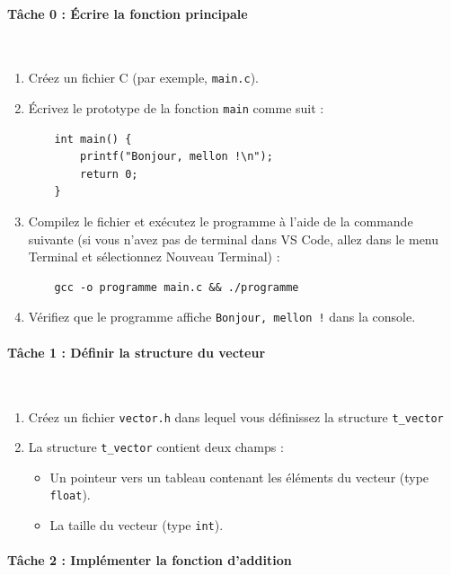 \begin{wtodo}{}

\paragraph{T\^ache 0 : \'Ecrire la fonction principale}\,

\begin{enumerate}
    \item Cr\'eez un fichier C (par exemple, \texttt{main.c}).
    \item \'Ecrivez le prototype de la fonction \texttt{main} comme suit :
    \begin{verbatim}
    int main() {
        printf("Bonjour, mellon !\n");
        return 0;
    }
    \end{verbatim}
    \item Compilez le fichier et ex\'ecutez le programme à l'aide de la commande suivante (si vous n'avez pas de terminal dans VS Code, allez dans le menu Terminal et s\'electionnez Nouveau Terminal) :
    \begin{verbatim}
    gcc -o programme main.c && ./programme
    \end{verbatim}
    \item V\'erifiez que le programme affiche \texttt{Bonjour, mellon !} dans la console.
\end{enumerate}

\paragraph{T\^ache 1 : D\'efinir la structure du vecteur}\,

\begin{enumerate}
   \item Créez un fichier {\tt vector.h} dans lequel vous définissez la structure \texttt{t\_vector}
    \item La structure \texttt{t\_vector} contient deux champs :
    \begin{itemize}
        \item Un pointeur vers un tableau contenant les \'el\'ements du vecteur (type \texttt{float}).
        \item La taille du vecteur (type \texttt{int}).
    \end{itemize}
\end{enumerate}

\paragraph{T\^ache 2 : Impl\'ementer la fonction d'addition}\,


\end{wtodo}
